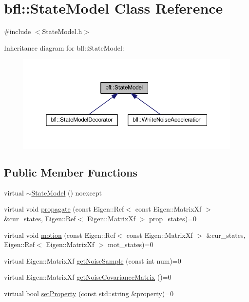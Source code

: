 \hypertarget{classbfl_1_1StateModel}{}\section{bfl\+:\+:State\+Model Class Reference}
\label{classbfl_1_1StateModel}


{\ttfamily \#include $<$State\+Model.\+h$>$}



Inheritance diagram for bfl\+:\+:State\+Model\+:
\nopagebreak
\begin{figure}[H]
\begin{center}
\leavevmode
\includegraphics[width=350pt]{classbfl_1_1StateModel__inherit__graph}
\end{center}
\end{figure}
\subsection*{Public Member Functions}
\begin{DoxyCompactItemize}
\item 
virtual \mbox{\hyperlink{classbfl_1_1StateModel_ae07722f42306f297da2e55ce8cb0214a}{$\sim$\+State\+Model}} () noexcept
\item 
virtual void \mbox{\hyperlink{classbfl_1_1StateModel_a47a625abb7df9b7afa689ccb9aa11aee}{propagate}} (const Eigen\+::\+Ref$<$ const Eigen\+::\+Matrix\+Xf $>$ \&cur\+\_\+states, Eigen\+::\+Ref$<$ Eigen\+::\+Matrix\+Xf $>$ prop\+\_\+states)=0
\item 
virtual void \mbox{\hyperlink{classbfl_1_1StateModel_a3601485697ae3445ec7ca753dbeb035c}{motion}} (const Eigen\+::\+Ref$<$ const Eigen\+::\+Matrix\+Xf $>$ \&cur\+\_\+states, Eigen\+::\+Ref$<$ Eigen\+::\+Matrix\+Xf $>$ mot\+\_\+states)=0
\item 
virtual Eigen\+::\+Matrix\+Xf \mbox{\hyperlink{classbfl_1_1StateModel_ab1f0aa4c804b7de86c68294de3df76ee}{get\+Noise\+Sample}} (const int num)=0
\item 
virtual Eigen\+::\+Matrix\+Xf \mbox{\hyperlink{classbfl_1_1StateModel_a606efee8bf37606833c1ac75f2fbb357}{get\+Noise\+Covariance\+Matrix}} ()=0
\item 
virtual bool \mbox{\hyperlink{classbfl_1_1StateModel_ac86dcdad8f0bbfab39a23e592779feaa}{set\+Property}} (const std\+::string \&property)=0
\end{DoxyCompactItemize}


